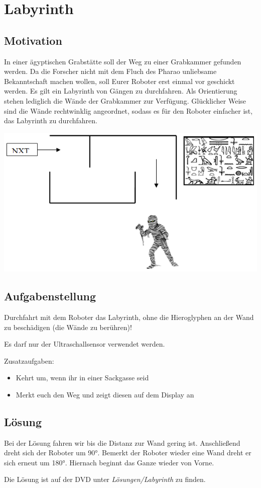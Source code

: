 \chapter{Labyrinth}
\section{Motivation}
In einer ägyptischen Grabstätte soll der Weg zu einer Grabkammer gefunden werden. Da die Forscher nicht mit dem Fluch des Pharao unliebsame Bekanntschaft machen wollen, soll Eurer Roboter erst einmal vor geschickt werden. Es gilt ein Labyrinth von Gängen zu durchfahren. Als Orientierung stehen lediglich die Wände der Grabkammer zur Verfügung. Glücklicher Weise sind die Wände rechtwinklig angeordnet, sodass es für den Roboter einfacher ist, das Labyrinth zu durchfahren. 

\begin{capfigure}[Labyrinth]
	\includegraphics[width=\textwidth]{images/labyrinth}
\end{capfigure}

\section{Aufgabenstellung}
Durchfahrt mit dem Roboter das Labyrinth, ohne die Hieroglyphen an der Wand zu beschädigen (die Wände zu berühren)!

Es darf nur der Ultraschallsensor verwendet werden.

Zusatzaufgaben:
\begin{itemize}
	\item Kehrt um, wenn ihr in einer Sackgasse seid
	\item Merkt euch den Weg und zeigt diesen auf dem Display an
\end{itemize}
\section{Lösung}
Bei der Lösung fahren wir bis die Distanz zur Wand gering ist. Anschließend dreht sich der Roboter um 90°. Bemerkt der Roboter wieder eine Wand dreht er sich erneut um 180°. Hiernach beginnt das Ganze wieder von Vorne.

Die Lösung ist auf der DVD unter \textit{Lösungen/Labyrinth} zu finden.